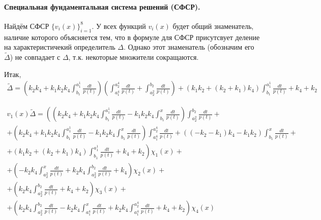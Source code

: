 \documentclass[a4paper,12pt]{article} %
\begin{document}
\paragraph{Специальная фундаментальная система решений (СФСР).}
Найдём СФСР $\{v_i(x)\}_{i=1}^{8}$.
У всех функций $v_i(x)$ будет общий знаменатель,
наличие которого объясняется тем,
что в формуле для СФСР присутсвует деление на характеристичекий определитель $\Delta$.
Однако этот знаменатель (обозначим его $\tilde{\Delta}$)
не совпадает с $\Delta$,
т.к. некоторые множители сокращаются.


Итак,
\begin{multline}
	\tilde{\Delta} =
	\left( k_2 k_4+k_1 k_2 k_4 \int_{b_1}^{a_1^1}\frac{dt}{p(t)}\right)
	\left( \int_{a_1^4}^{a_2^4}\frac{dt}{p(t)}+ \int_{a_2^2}^{b_2}\frac{dt}{p(t)} \right)+
	\left( k_1 k_2+\left( k_2+k_1\right)  k_4\right)  \int_{b_1}^{a_1^1}\frac{dt}{p(t)}+k_4+k_2
\end{multline}

\begin{multline}
	{v_1(x)}{\tilde{\Delta}}=
	\left(
		\left( k_2 k_4+k_1 k_2 k_4 \int_{b_1}^{a_1^1}\frac{dt}{p(t)}-k_1 k_2 k_4 \int_{b_1}^{x}\frac{dt}{p(t)}\right)  \int_{a_2^2}^{b_2}\frac{dt}{p(t)}
		\right. +\\+ \left.
		\left( k_2 k_4+k_1 k_2 k_4 \int_{b_1}^{a_1^1}\frac{dt}{p(t)}-k_1 k_2 k_4 \int_{b_1}^{x}\frac{dt}{p(t)}\right)  \int_{a_1^4}^{a_2^4}\frac{dt}{p(t)}+\left( \left( -k_2-k_1\right)  k_4-k_1 k_2\right)  \int_{b_1}^{x}\frac{dt}{p(t)}
		\right. +\\+ \left.
		\left( k_1 k_2+\left( k_2+k_1\right)  k_4\right)  \int_{b_1}^{a_1^1}\frac{dt}{p(t)}+k_4+k_2
	\right)\chi_1(x)
	+\\+
	\left(
		-k_2 k_4 \int_{a_2^2}^{x}\frac{dt}{p(t)}+k_2 k_4 \int_{a_2^2}^{b_2}\frac{dt}{p(t)}+k_4
	\right)\chi_2(x)
	+\\+
	\left(
		k_2 k_4 \int_{a_2^2}^{b_2}\frac{dt}{p(t)}+k_4+k_2
	\right)\chi_3(x)
	+\\+
	\left(
		k_2 k_4 \int_{a_2^2}^{b_2}\frac{dt}{p(t)}-k_2 k_4 \int_{a_1^4}^{x}\frac{dt}{p(t)}+k_2 k_4 \int_{a_1^4}^{a_2^4}\frac{dt}{p(t)}+k_4+k_2
	\right)\chi_4(x)
\end{multline}
\end{document}

